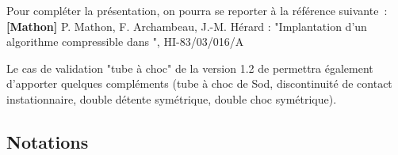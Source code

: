 Pour compléter la présentation, on pourra se reporter à la référence
suivante~: \\
\textbf{[Mathon]} P. Mathon, F. Archambeau, J.-M. Hérard : "Implantation d'un
algorithme compressible dans \CS", HI-83/03/016/A

Le cas de validation "tube \`a choc" de la version 1.2 de \CS permettra
\'egalement d'apporter quelques compl\'ements (tube \`a choc de Sod,
discontinuit\'e de contact instationnaire, double d\'etente sym\'etrique,
double choc sym\'etrique).

\newpage
\subsection*{Notations}

